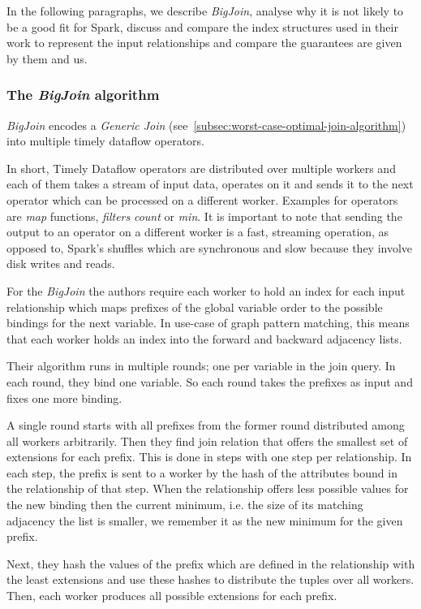 In the following paragraphs, we describe \textit{BigJoin}, analyse why it is not likely to be a good fit for Spark,
discuss and compare the index structures used in their work to represent the input relationships and compare the
guarantees are given by them and us.

\subsubsection{The \textit{BigJoin} algorithm}
\textit{BigJoin} encodes a \textit{Generic Join} (see~\cref{subsec:worst-case-optimal-join-algorithm}) into multiple
timely dataflow operators.

In short, Timely Dataflow operators are distributed over multiple workers and each of them takes a stream of input data, operates
on it and sends it to the next operator which can be processed on a different worker.
Examples for operators are \textit{map} functions, \textit{filters} \textit{count} or \textit{min}.
It is important to note that sending the output to an operator on a different worker is a fast, streaming operation, as opposed to,
Spark's shuffles which are synchronous and slow because they involve disk writes and reads.

For the \textit{BigJoin} the authors require each worker to hold an index for each input relationship which maps prefixes
of the global variable order to the possible bindings for the next variable.
In use-case of graph pattern matching, this means that each worker holds an index into the forward and backward adjacency lists.

Their algorithm runs in multiple rounds;
one per variable in the join query.
In each round, they bind one variable.
So each round takes the prefixes as input and fixes one more binding.

A single round starts with all prefixes from the former round distributed among all workers arbitrarily.
Then they find join relation that offers the smallest set of extensions for each prefix.
This is done in steps with one step per relationship.
In each step, the prefix is sent to a worker by the hash of the attributes bound in the relationship of that step.
When the relationship offers less possible values for the new binding then the current minimum, i.e. the size of its matching adjacency
the list is smaller, we remember it as the new minimum for the given prefix.

Next, they hash the values of the prefix which are defined in the relationship with the least extensions and use these hashes to
distribute the tuples over all workers.
Then, each worker produces all possible extensions for each prefix.

